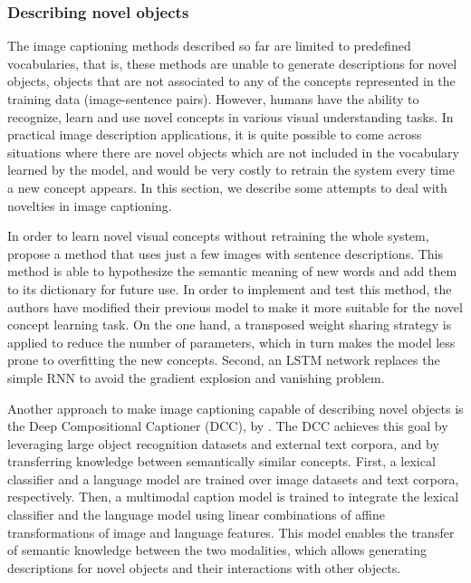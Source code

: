\subsubsection{Describing novel objects}\label{sec:novel_objects}

The image captioning methods described so far are limited to predefined vocabularies, that is, these methods are unable to generate descriptions for novel objects, objects that are not associated to any of the concepts represented in the training data (image-sentence pairs). However, humans have the ability to recognize, learn and use novel concepts in various visual understanding tasks. In practical image description applications, it is quite possible to come across situations where there are novel objects which are not included in the vocabulary learned by the model, and would be very costly to retrain the system every time a new concept appears. In this section, we describe some attempts to deal with novelties in image captioning. 

In order to learn novel visual concepts without retraining the whole system, \citet{Mao2015_Child} propose a method that uses just a few images with sentence descriptions. This method is able to hypothesize the semantic meaning of new words and add them to its dictionary for future use. In order to implement and test this method, the authors have modified their previous model \citep{Mao2015_mRNN} to make it more suitable for the novel concept learning task. On the one hand, a transposed weight sharing strategy is applied to reduce the number of parameters, which in turn makes the model less prone to overfitting the new concepts. Second, an LSTM network replaces the simple RNN to avoid the gradient explosion and vanishing problem. 

Another approach to make image captioning capable of describing novel objects is the Deep Compositional Captioner (DCC), by \citet{Hendricks2016}. The DCC achieves this goal by leveraging large object recognition datasets and external text corpora, and by transferring knowledge between semantically similar concepts. First, a lexical classifier and a language model are trained over image datasets and text corpora, respectively. Then, a multimodal caption model is trained to integrate the lexical classifier and the language model using linear combinations of affine transformations of image and language features. This model enables the transfer of semantic knowledge between the two modalities, which allows generating descriptions for novel objects and their interactions with other objects. 

